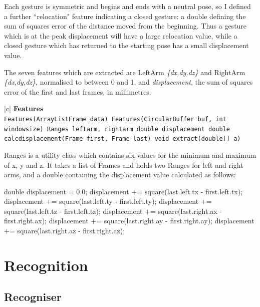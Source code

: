 \documentclass[12pt,a4,notitlepage]{report}
\renewcommand{\_}{\texttt{\symbol{95}}}
\newcommand{\<}{\texttt{\symbol{60}}}
\renewcommand{\>}{\texttt{\symbol{62}}}
\newcommand{\class}[1]{\textbf{#1}}
\newcommand{\variable}[1]{\texttt{#1}}
\begin{document}
Each gesture is symmetric and begins and ends with a neutral pose, so I defined a further ``relocation" feature indicating a closed gesture: a double defining the sum of squares error of the distance moved from the beginning. Thus a gesture which is at the peak displacement will have a large relocation value, while a closed gesture which has returned to the starting pose has a small displacement value.

The seven features which are extracted are LeftArm {\em\{dx,dy,dz\}} and RightArm {\em\{dx,dy,dz\}}, normalised to between 0 and 1, and {\em displacement}, the sum of squares error of the first and last frames, in millimetres.

\begin{tabular}{|c|} \hline 
\class{Features} \\ \hline
{}
{\variable{Features(ArrayList\<Frame\> data) \newline
Features(CircularBuffer buf, int windowsize) \newline
Ranges leftarm, rightarm \newline
double displacement \newline
double calc\_displacement(Frame first, Frame last) \newline
void extract(double[] a)
} } \\ \hline
\end{tabular}

Ranges is a utility class which contains six values for the minimum and maximum of x, y and z.  It takes a list of Frames and holds two Ranges for left and right arms, and a double containing the displacement value calculated as follows:
\begin{code}
double displacement = 0.0;
displacement += square(last.left.tx - first.left.tx);
displacement += square(last.left.ty - first.left.ty);
displacement += square(last.left.tz - first.left.tz);
displacement += square(last.right.ax - first.right.ax);
displacement += square(last.right.ay - first.right.ay);
displacement += square(last.right.az - first.right.az);
\end{code}
\section{Recognition}

\subsection{Recogniser}
\end{document}
